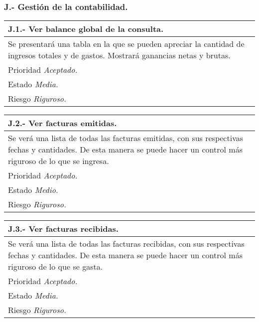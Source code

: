 	\subsubsection{J.- Gestión de la contabilidad.}

	\begin{center}
	\begin{tabulary}{15cm}{|L|}
		\hline
			\bf{J.1.- Ver balance global de la consulta.} \\
		\hline
			Se presentará una tabla en la que se pueden apreciar la cantidad de ingresos totales y de gastos. Mostrará ganancias netas y brutas. \\
		\hline
			Prioridad \textit{Aceptado.} \\
		\hline
			Estado \textit{Media.} \\
		\hline
			Riesgo \textit{Riguroso.} \\
		\hline
	\end{tabulary}
	\end{center}

	\begin{center}
	\begin{tabulary}{15cm}{|L|}
		\hline
			\bf{J.2.- Ver facturas emitidas.} \\
		\hline
			Se verá una lista de todas las facturas emitidas, con sus respectivas fechas y cantidades. De esta manera se puede hacer un control más riguroso de lo que se ingresa. \\
		\hline
			Prioridad \textit{Aceptado.} \\
		\hline
			Estado \textit{Medio.} \\
		\hline
			Riesgo \textit{Riguroso.} \\
		\hline
	\end{tabulary}
	\end{center}

	\begin{center}
	\begin{tabulary}{15cm}{|L|}
		\hline
			\bf{J.3.- Ver facturas recibidas.} \\
		\hline
			Se verá una lista de todas las facturas recibidas, con sus respectivas fechas y cantidades. De esta manera se puede hacer un control más riguroso de lo que se gasta. \\
		\hline
			Prioridad \textit{Aceptado.} \\
		\hline
			Estado \textit{Media.} \\
		\hline
			Riesgo \textit{Riguroso.} \\
		\hline
	\end{tabulary}
	\end{center}


